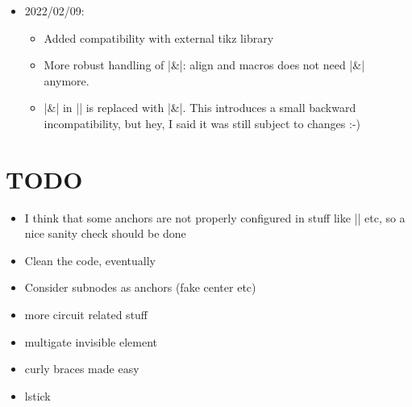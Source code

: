 \documentclass[a4paper,doc2]{ltxdoc} %
\begin{document}
\begin{itemize}
\begin{itemize}
  \item updated the doc to use the latest version of robust-externalize that is much simpler to use now\dots
  \item Some nodes can also now be usable outside tikzcd, but I've not tried (I should provide more options for this).
  \item Group gates
  \end{itemize}
\item 2022/02/09:
  \begin{itemize}
  \item Added compatibility with external tikz library
  \item More robust handling of |&|: align and macros does not need |\&| anymore.
  \item |\&| in |\zxSaveDiagram| is replaced with |&|. This introduces a small backward incompatibility, but hey, I said it was still subject to changes :-)
  \end{itemize}
\end{itemize}

\section{TODO}
\begin{itemize}
\item I think that some anchors are not properly configured in stuff like |\zxBox| etc, so a nice sanity check should be done
\item Clean the code, eventually
\item Consider subnodes as anchors (fake center etc)
\item more circuit related stuff
\item multigate invisible element
\item curly braces made easy
\item lstick
\end{itemize}

\printindex

\printbibliography[heading=bibintoc]
\end{document}
